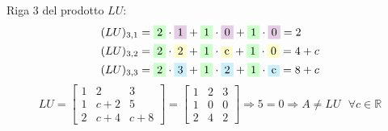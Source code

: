 \documentclass[12pt,a4paper]{article}
\begin{document}
Riga 3 del prodotto \( LU \):
\[
\begin{aligned}
(LU)_{3,1} &= \colorbox{green!20}{2} \cdot \colorbox{violet!20}{1} + \colorbox{green!20}{1} \cdot \colorbox{violet!20}{0} + \colorbox{green!20}{1} \cdot \colorbox{violet!20}{0} = 2 \\
(LU)_{3,2} &= \colorbox{green!20}{2} \cdot \colorbox{yellow!20}{2} + \colorbox{green!20}{1} \cdot \colorbox{yellow!20}{c} + \colorbox{green!20}{1} \cdot \colorbox{yellow!20}{0} = 4 + c \\
(LU)_{3,3} &= \colorbox{green!20}{2} \cdot \colorbox{cyan!20}{3} + \colorbox{green!20}{1} \cdot \colorbox{cyan!20}{2} + \colorbox{green!20}{1} \cdot \colorbox{cyan!20}{c} = 8 + c \\
\end{aligned}
\]
\vspace{1em}
\[
LU =
\begin{bmatrix}
1 & 2 & 3 \\
1 & c + 2 & 5 \\
2 & c + 4 & c + 8
\end{bmatrix}
=
\begin{bmatrix}
1 & 2 & 3 \\
1 & 0 & 0 \\
2 & 4 & 2
\end{bmatrix}
\Rightarrow 5 = 0 \Rightarrow   A \not= LU \text{   } \forall c \in \mathbb{R}
\]


\newpage
\noindent
{}
\end{document}
